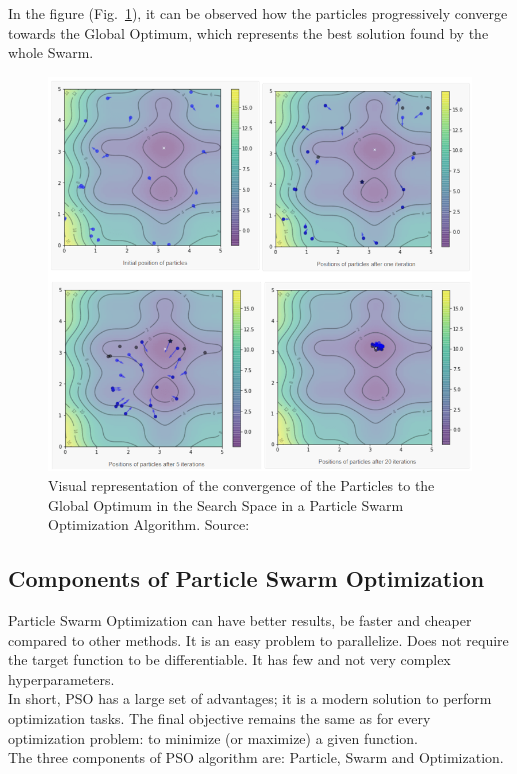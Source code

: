 In the figure (Fig.~\ref{fig:figure-3.1.1}), it can be observed how the particles progressively converge towards the Global Optimum, which represents the best solution found by the whole Swarm.
\begin{figure}[t]
	\centering
	\includegraphics[width=14cm]{figures/figure-3.1.1.png}
	\caption[Visual Representation of Particle Swarm Optimization]{Visual representation of the convergence of the Particles to the Global Optimum in the Search Space in a Particle Swarm Optimization Algorithm. Source:~\cite{Tesi-3.1}}
	\label{fig:figure-3.1.1}
\end{figure}

\subsection{Components of Particle Swarm Optimization}

Particle Swarm Optimization can have better results, be faster and cheaper compared to other methods. It is an easy problem to parallelize. Does not require the target function to be differentiable. It has few and not very complex hyperparameters.
\\[0.3cm]In short, PSO has a large set of advantages; it is a modern solution to perform optimization tasks. The final objective remains the same as for every optimization problem: to minimize (or maximize) a given function.
\\[0.3cm]The three components of PSO algorithm are: Particle, Swarm and Optimization.

